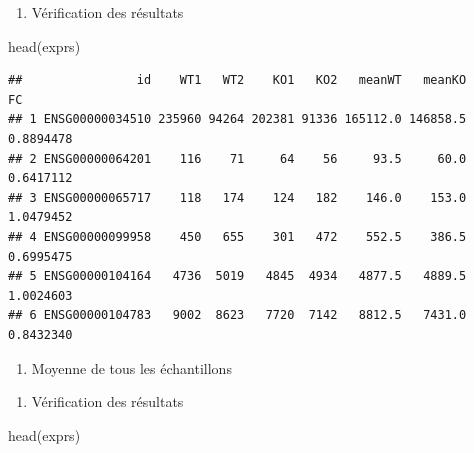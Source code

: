 \documentclass[
]{book}
\newenvironment{Shaded}{\begin{snugshade}}{\end{snugshade}}
\newcommand{\FunctionTok}[1]{\textcolor[rgb]{0.00,0.00,0.00}{#1}}
\newcommand{\NormalTok}[1]{#1}
\newcommand{\OtherTok}[1]{\textcolor[rgb]{0.56,0.35,0.01}{#1}}
\newcommand{\SpecialCharTok}[1]{\textcolor[rgb]{0.00,0.00,0.00}{#1}}
\newcommand{\StringTok}[1]{\textcolor[rgb]{0.31,0.60,0.02}{#1}}
\providecommand{\tightlist}{%
  \setlength{\itemsep}{0pt}\setlength{\parskip}{0pt}}
\begin{document}
\begin{enumerate}
\def\labelenumi{\arabic{enumi}.}
\setcounter{enumi}{4}
\tightlist
\item
  Vérification des résultats
\end{enumerate}

\begin{Shaded}
\begin{Highlighting}[]
\FunctionTok{head}\NormalTok{(exprs) }
\end{Highlighting}
\end{Shaded}

\begin{verbatim}
##                id    WT1   WT2    KO1   KO2   meanWT   meanKO        FC
## 1 ENSG00000034510 235960 94264 202381 91336 165112.0 146858.5 0.8894478
## 2 ENSG00000064201    116    71     64    56     93.5     60.0 0.6417112
## 3 ENSG00000065717    118   174    124   182    146.0    153.0 1.0479452
## 4 ENSG00000099958    450   655    301   472    552.5    386.5 0.6995475
## 5 ENSG00000104164   4736  5019   4845  4934   4877.5   4889.5 1.0024603
## 6 ENSG00000104783   9002  8623   7720  7142   8812.5   7431.0 0.8432340
\end{verbatim}

\begin{enumerate}
\def\labelenumi{\arabic{enumi}.}
\setcounter{enumi}{5}
\tightlist
\item
  Moyenne de tous les échantillons
\end{enumerate}

\begin{Shaded}
\end{Shaded}

\begin{enumerate}
\def\labelenumi{\arabic{enumi}.}
\setcounter{enumi}{6}
\tightlist
\item
  Vérification des résultats
\end{enumerate}

\begin{Shaded}
\begin{Highlighting}[]
\FunctionTok{head}\NormalTok{(exprs) }
\end{Highlighting}
\end{Shaded}
\end{document}
